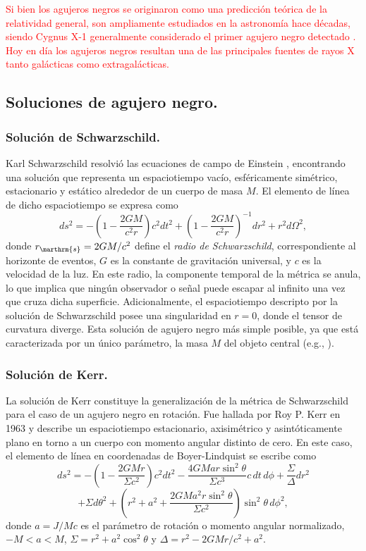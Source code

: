 	\textcolor{red}{Si bien los agujeros negros se originaron como una predicci\'on teórica de la relatividad general, son ampliamente estudiados en la astronomía hace décadas, siendo Cygnus X-1 generalmente considerado el primer agujero negro detectado \citep{Webster1972}. Hoy en d\'ia los agujeros negros resultan una de las principales fuentes de rayos X tanto galácticas como extragalácticas.}

\subsection{Soluciones de agujero negro.}\label{ssec:AN}

\subsubsection*{Solución de Schwarzschild.}

	Karl Schwarzschild resolvió las ecuaciones de campo de Einstein \citep{Schwarzschild1916}, encontrando una solución que representa un espaciotiempo vacío, esféricamente simétrico, estacionario y estático alrededor de un cuerpo de masa $M$.
	El elemento de línea de dicho espaciotiempo se expresa como
\[
ds^2 = -\left(1-\frac{2GM}{c^2r}\right)c^2 dt^2 + \left(1-\frac{2GM}{c^2r}\right)^{-1} dr^2 + r^2 d\Omega^2,
\]
donde $r_\marthrm{s} = 2GM/c^2$ define el \textit{radio de Schwarzschild}, correspondiente al horizonte de eventos, $G$ es la constante de gravitación universal, y $c$ es la velocidad de la luz.
	En este radio, la componente temporal de la métrica se anula, lo que implica que ningún observador o señal puede escapar al infinito una vez que cruza dicha superficie.
	Adicionalmente, el espaciotiempo descripto por la solución de Schwarzschild posee una singularidad en $r=0$, donde el tensor de curvatura diverge. 
	Esta solución de agujero negro más simple posible, ya que está caracterizada por un único parámetro, la masa $M$ del objeto central (e.g., \citealt{Carroll2004}).

\subsubsection*{Soluci\'on de Kerr.}

	La solución de Kerr \citep{Kerr1963} constituye la generalización de la métrica de Schwarzschild para el caso de un agujero negro en rotación.
	Fue hallada por Roy P. Kerr en 1963 y describe un espaciotiempo estacionario, axisimétrico y asintóticamente plano en torno a un cuerpo con momento angular distinto de cero.
	En este caso, el elemento de l\'inea en coordenadas de Boyer-Lindquist se escribe como
\begin{equation*}
	ds^2 = -\left(1-\frac{2GMr}{\Sigma c^2}\right)c^2dt^2 - \frac{4GMar\sin^2\theta}{\Sigma c^3}c\,dt\,d\phi + \frac{\Sigma}{\Delta}dr^2 
\end{equation*}
\begin{equation*}
	+ \Sigma d\theta^2 + \left(r^2 + a^2 + \frac{2GMa^2r\sin^2\theta}{\Sigma c^2}\right)\sin^2\theta\,d\phi^2,
\end{equation*}
donde $a = J/Mc$ es el parámetro de rotación o momento angular normalizado, $-M < a < M$, $\Sigma = r^2 + a^2\cos^2\theta$ y $\Delta = r^2 - 2GMr/c^2 + a^2$. 


